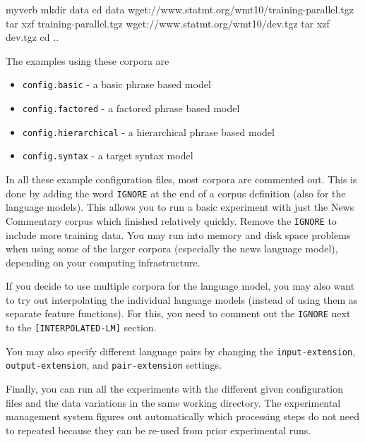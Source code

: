 \begin{SaveVerbatim}{myverb}
 mkdir data
 cd data
 wget://www.statmt.org/wmt10/training-parallel.tgz
 tar xzf training-parallel.tgz
 wget://www.statmt.org/wmt10/dev.tgz
 tar xzf dev.tgz
 cd ..
\end{SaveVerbatim}
\colorbox{gray}{%
}

The examples using these corpora are

\begin{itemize}
\item {\tt config.basic} - a basic phrase based model

\item {\tt config.factored} - a factored phrase based model

\item {\tt config.hierarchical} - a hierarchical phrase based model

\item {\tt config.syntax} - a target syntax model

\end{itemize}

In all these example configuration files, most corpora are commented out. This is done by adding the word {\tt IGNORE} at the end of a corpus definition (also for the language models). This allows you to run a basic experiment with just the News Commentary corpus which finished relatively quickly. 
Remove the {\tt IGNORE} to include more training data. You may run into memory and disk space problems when using some of the larger corpora (especially the news language model), depending on your computing infrastructure.



If you decide to use multiple corpora for the language model, you may also want to try out interpolating the individual language models (instead of using them as separate feature functions). For this, you need to comment out the {\tt IGNORE} next to the {\tt [INTERPOLATED-LM]} section.



You may also specify different language pairs by changing the {\tt input-extension}, {\tt output-extension}, and {\tt pair-extension} settings.



Finally, you can run all the experiments with the different given configuration files and the data variations in the same working directory. The experimental management system figures out automatically which processing steps do not need to repeated because they can be re-used from prior experimental runs.



